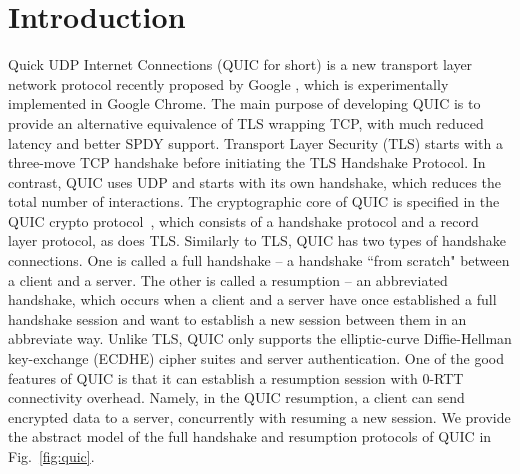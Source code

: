 \section{Introduction} \label{sec:intro}
Quick UDP Internet Connections (QUIC for short) is a new transport layer network protocol recently proposed by Google \cite{QUIC}, which is experimentally implemented in Google Chrome.
The main purpose of developing QUIC is to provide an alternative equivalence of TLS wrapping TCP,
with much reduced latency and better SPDY support.
Transport Layer Security (TLS) starts with a three-move TCP handshake
before initiating the TLS Handshake Protocol.
In contrast, QUIC uses UDP and starts with its own handshake,
which reduces the total number of interactions.
The cryptographic core of QUIC is specified in the QUIC crypto protocol~\cite{QUIC:Crypto},
which consists of a handshake protocol and a record layer protocol,
as does TLS.
Similarly to TLS, QUIC has two types of handshake connections.
One is called a full handshake --
a handshake ``from scratch" between a client and a server.
The other is called a resumption -- an abbreviated handshake,
which occurs when a client and a server have once established a full handshake session
and want to establish a new session between them in an abbreviate way.
Unlike TLS,
QUIC only supports the elliptic-curve Diffie-Hellman key-exchange (ECDHE) cipher suites and server authentication.
%
One of the good features of QUIC is that it can establish a resumption session
with $0$-RTT connectivity overhead.
Namely, in the QUIC resumption, a client can
send encrypted data to a server, concurrently with resuming a new session.
We provide the abstract model of the full handshake and resumption protocols of QUIC
in Fig.~\ref{fig:quic}.


